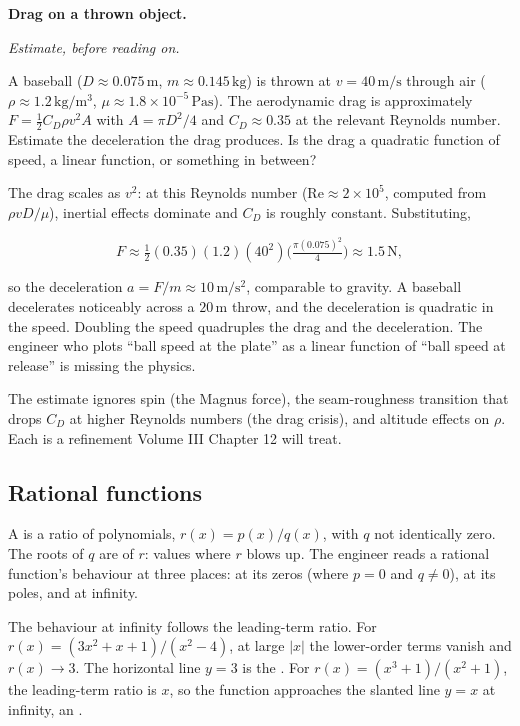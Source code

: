 \begin{estimation}
\textbf{Drag on a thrown object.}

\smallskip
\textit{Estimate, before reading on.}

\smallskip
A baseball ($D \approx 0.075 \,\si{\meter}$, $m \approx 0.145
\,\si{\kilogram}$) is thrown at $v = 40 \,\si{\meter\per\second}$
through air ($\rho \approx 1.2 \,\si{\kilogram\per\meter\cubed}$,
$\mu \approx 1.8 \times 10^{-5} \,\si{\pascal\second}$). The
aerodynamic drag is approximately $F = \tfrac{1}{2} C_{D} \rho v^{2}
A$ with $A = \pi D^{2}/4$ and $C_{D} \approx 0.35$ at the relevant
Reynolds number. Estimate the deceleration the drag produces. Is the
drag a quadratic function of speed, a linear function, or something
in between?

The drag scales as $v^{2}$: at this Reynolds number ($\mathrm{Re}
\approx 2 \times 10^{5}$, computed from $\rho v D / \mu$), inertial
effects dominate and $C_{D}$ is roughly constant. Substituting,

\[
F \approx \tfrac{1}{2} (0.35)(1.2)(40^{2})\bigl(\tfrac{\pi (0.075)^{2}}
{4}\bigr) \approx 1.5 \,\si{\newton},
\]

so the deceleration $a = F/m \approx 10 \,\si{\meter\per\second
\squared}$, comparable to gravity. A baseball decelerates noticeably
across a $20 \,\si{\meter}$ throw, and the deceleration is quadratic
in the speed. Doubling the speed quadruples the drag and the
deceleration. The engineer who plots ``ball speed at the plate'' as a
linear function of ``ball speed at release'' is missing the physics.

The estimate ignores spin (the Magnus force), the seam-roughness
transition that drops $C_{D}$ at higher Reynolds numbers (the drag
crisis), and altitude effects on $\rho$. Each is a refinement Volume
III Chapter 12 will treat.
\end{estimation}

\subsection{Rational functions}

A  is a ratio of polynomials, $r(x) =
p(x)/q(x)$, with $q$ not identically zero. The roots of $q$ are
 of $r$: values where $r$ blows up. The engineer reads
a rational function's behaviour at three places: at its zeros (where
$p = 0$ and $q \neq 0$), at its poles, and at infinity.

The behaviour at infinity follows the leading-term ratio. For
$r(x) = (3x^{2} + x + 1)/(x^{2} - 4)$, at large $|x|$ the lower-order
terms vanish and $r(x) \to 3$. The horizontal line $y = 3$ is the
. For $r(x) = (x^{3} + 1)/(x^{2} + 1)$,
the leading-term ratio is $x$, so the function approaches the slanted
line $y = x$ at infinity, an .

